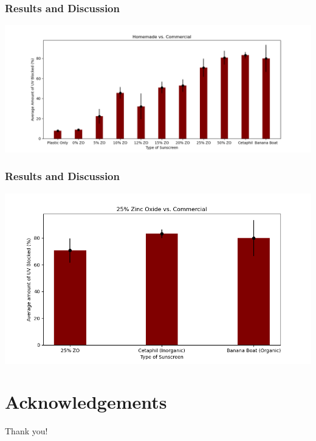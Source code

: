 \documentclass[10pt,aspectratio=169]{beamer} %
\begin{document}
\begin{frame}\centering
  \frametitle{Results and Discussion}
  \includegraphics[scale = 0.4]{SunscreenDataPlot.png}
\end{frame}
\begin{frame}\centering
  \frametitle{Results and Discussion}
  \includegraphics[scale = 0.47]{25ZOvsCommercialPlot.png}
\end{frame}

\section{Acknowledgements}
\begin{frame}\centering\Huge
  Thank you!
\end{frame}
\end{document}
